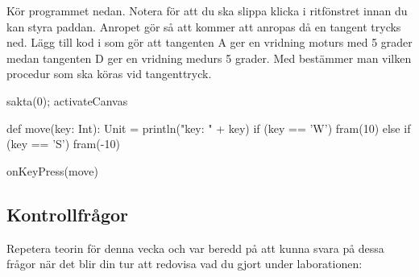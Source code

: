 \Subtask \label{subtask:keypress}  Kör programmet nedan. Notera  för att du ska slippa klicka i ritfönstret innan du kan styra paddan. Anropet  gör så att  kommer att anropas då en tangent trycks ned. Lägg till kod i  som gör att tangenten A ger en vridning moturs med 5 grader medan tangenten D ger en vridning medurs 5 grader. Med  bestämmer man vilken procedur som ska köras vid tangenttryck.

\begin{Code}
sakta(0); activateCanvas

def move(key: Int): Unit = {
  println("key: " + key)
  if (key == 'W') fram(10)
  else if (key == 'S') fram(-10)
}

onKeyPress(move)
\end{Code}





\subsection{Kontrollfrågor}\Checkpoint

\noindent Repetera teorin för denna vecka och var beredd på att kunna svara på dessa frågor när det blir din tur att redovisa vad du gjort under laborationen:

